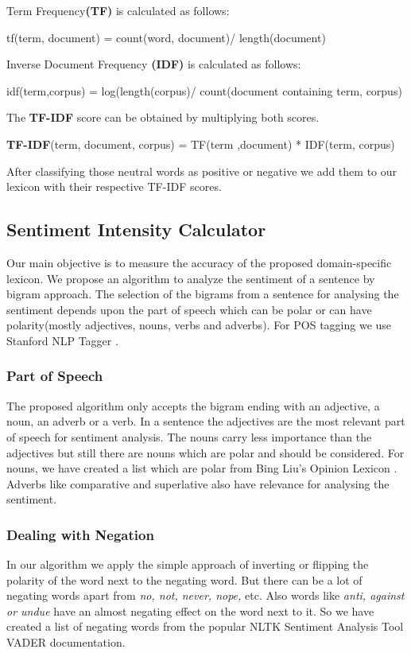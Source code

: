 \documentclass[a4paper, 10pt, conference]{ieeeconf}      %
\begin{document}
Term Frequency\textbf{(TF)} is calculated as follows:

	tf(term, document) = count(word, document)/ length(document)

	
Inverse Document Frequency \textbf{(IDF)} is calculated as follows:

	idf(term,corpus) = log(length(corpus)/ 	count(document containing term, corpus)


The \textbf{TF-IDF} score can be obtained by multiplying both scores. 

	\textbf{TF-IDF}(term, document, corpus) = TF(term ,document)
	 * IDF(term, corpus)
	 
After classifying those neutral words as positive or negative we add them to our lexicon with their respective TF-IDF scores.

\subsection{Sentiment Intensity Calculator}
Our main objective is to measure the accuracy of the proposed domain-specific lexicon. We propose an algorithm to analyze the sentiment of a sentence by bigram approach. The selection of the bigrams from a sentence for analysing the sentiment depends upon the part of speech which can be polar or can have polarity(mostly adjectives, nouns, verbs and adverbs). For POS tagging we use Stanford NLP Tagger \cite{c8}.
\subsubsection{Part of Speech}
The proposed algorithm only accepts the bigram ending with an adjective, a noun, an adverb or a verb.
In a sentence the adjectives are the most relevant part of speech for sentiment analysis. The nouns carry less importance than the adjectives but still there are nouns which are polar and should be considered. For nouns, we have created a list which are polar from Bing Liu's Opinion Lexicon \cite{c9,c10}. Adverbs like comparative and superlative also have relevance for analysing the sentiment. 
\subsubsection{Dealing with Negation}In our algorithm we apply the simple approach of inverting or flipping the polarity of the word next to the negating word. But there can be a lot of negating words apart from \textit{no, not, never, nope, }etc. Also words like \textit{anti, against or undue} have an almost negating effect on the word next to it. So we have created a list of negating words from the popular NLTK Sentiment Analysis Tool VADER \cite{c11} documentation.
\end{document}
